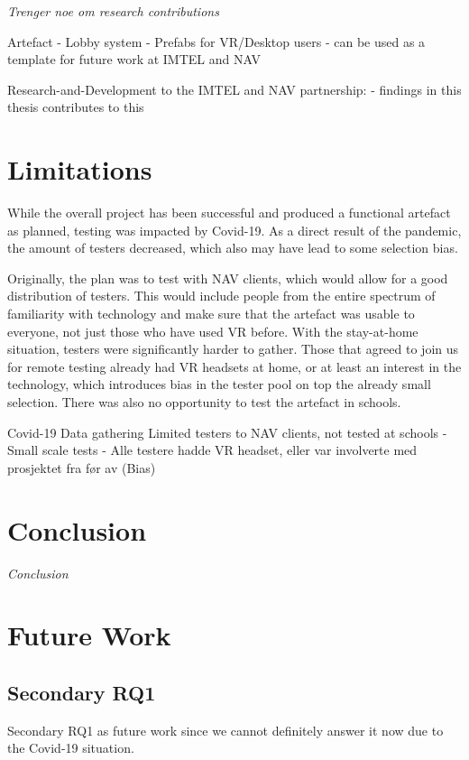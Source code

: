 \textit{Trenger noe om research contributions}

Artefact
- Lobby system
- Prefabs for VR/Desktop users
- can be used as a template for future work at IMTEL and NAV

Research-and-Development to the IMTEL and NAV partnership:
- findings in this thesis contributes to this


\section{Limitations}
While the overall project has been successful and produced a functional artefact as planned, testing was impacted by Covid-19. As a direct result of the pandemic, the amount of testers decreased, which also may have lead to some selection bias.

Originally, the plan was to test with NAV clients, which would allow for a good distribution of testers. This would include people from the entire spectrum of familiarity with technology and make sure that the artefact was usable to everyone, not just those who have used VR before. With the stay-at-home situation, testers were significantly harder to gather. Those that agreed to join us for remote testing already had VR headsets at home, or at least an interest in the technology, which introduces bias in the tester pool on top the already small selection. There was also no opportunity to test the artefact in schools.

Covid-19
Data gathering
Limited testers to NAV clients, not tested at schools
- Small scale tests
- Alle testere hadde VR headset, eller var involverte med prosjektet fra før av (Bias)





\section{Conclusion}
\textit{Conclusion}

\section{Future Work}
\label{section:futureWork}

\subsection{Secondary RQ1}
Secondary RQ1 as future work since we cannot definitely answer it now due to the Covid-19 situation.

